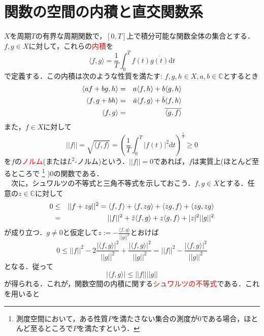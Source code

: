 \documentclass[a4j]{jsbook}
\numberwithin{theorem}{chapter}  %
\begin{document}
\section{関数の空間の内積と直交関数系} \label{sec1-8}
\(X\)を周期\(T\)の有界な周期関数で，\([0, T]\)上で積分可能な関数全体の集合とする．\(f, g\in X\)に対して，これらの\textcolor{red}{内積}を
\begin{equation*}
    \langle f, g\rangle=\frac{1}{T}\int_0^T f(t)\overline{g(t)}\mathrm{d}t
\end{equation*}
で定義する．この内積は次のような性質を満たす: \(f, g, h\in X, a, b\in\mathbb{C}\)とするとき
\begin{eqnarray*}
\langle af+bg, h\rangle&=&a\langle f, h\rangle+b\langle g, h\rangle \\
\langle f, g+bh\rangle&=&\Bar{a}\langle f, g\rangle+\Bar{b}\langle f, h\rangle \\
\langle f, g\rangle&=&\overline{\langle g, f\rangle}
\end{eqnarray*}
また，\(f\in X\)に対して
\begin{equation*}
    ||f||=\sqrt{\langle f, f\rangle}=\left(\frac{1}{T}\int_0^T |f(t)|^2\mathrm{d}t\right)^{\frac{1}{2}}\geq 0
\end{equation*}
を\(f\)の\textcolor{red}{ノルム}(または\(L^2\)-ノルム)という．\(||f||=0\)であれば，\(f\)は実質上(ほとんど至るところで
\footnote{測度空間において，ある性質\(P\)を満たさない集合の測度が0である場合，ほとんど至るところで\(P\)を満たすという．
}
)0の関数である．\\
　次に，シュワルツの不等式と三角不等式を示しておこう．\(f, g\in X\)とする．任意の\(z\in\mathbb{C}\)に対して
\begin{eqnarray*}
0&\leq&||f+zg||^2=\langle f, f\rangle+\langle f, zg\rangle+\langle zg, f\rangle+\langle zg, zg\rangle \\
&=&||f||^2+\Bar{z}\langle f, g\rangle+z\langle g, f\rangle+|z|^2||g||^2
\end{eqnarray*}
が成り立つ．\(g\neq 0\)と仮定して\(\displaystyle z:=-\frac{\langle f, g\rangle}{||g||^2}\)とおけば
\begin{equation*}
    0\leq ||f||^2-2\frac{|\langle f, g\rangle|^2}{||g||^2}+\frac{|\langle f, g\rangle|^2}{||g||^2}=||f||^2-\frac{|\langle f, g\rangle|^2}{||g||^2}
\end{equation*}
となる．従って
\begin{equation}
    |\langle f, g\rangle|\leq ||f||||g|| \label{eq1-18}
\end{equation}
が得られる．これが，関数空間の内積に関する\textcolor{red}{シュワルツの不等式}である．これを用いると
\end{document}
